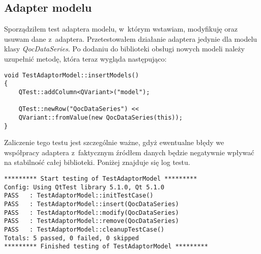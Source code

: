 \subsection{Adapter modelu}
Sporządziłem test adaptera modelu, w~którym wstawiam, modyfikuję oraz usuwam dane z~adaptera. Przetestowałem działanie adaptera jedynie dla modelu klasy \textit{QocDataSeries}. Po dodaniu do biblioteki obsługi nowych modeli należy uzupełnić metodę, która teraz wygląda następująco:

\begin{lstlisting}
void TestAdaptorModel::insertModels()
{
	QTest::addColumn<QVariant>("model");

	QTest::newRow("QocDataSeries") << 
	QVariant::fromValue(new QocDataSeries(this));
}
\end{lstlisting}

Zaliczenie tego testu jest szczególnie ważne, gdyż ewentualne błędy we współpracy adaptera z~faktycznym źródłem danych będzie negatywnie wpływać na stabilność całej biblioteki. Poniżej znajduje się log testu.

\begin{lstlisting}
********* Start testing of TestAdaptorModel *********
Config: Using QtTest library 5.1.0, Qt 5.1.0
PASS   : TestAdaptorModel::initTestCase()
PASS   : TestAdaptorModel::insert(QocDataSeries)
PASS   : TestAdaptorModel::modify(QocDataSeries)
PASS   : TestAdaptorModel::remove(QocDataSeries)
PASS   : TestAdaptorModel::cleanupTestCase()
Totals: 5 passed, 0 failed, 0 skipped
********* Finished testing of TestAdaptorModel *********
\end{lstlisting}






